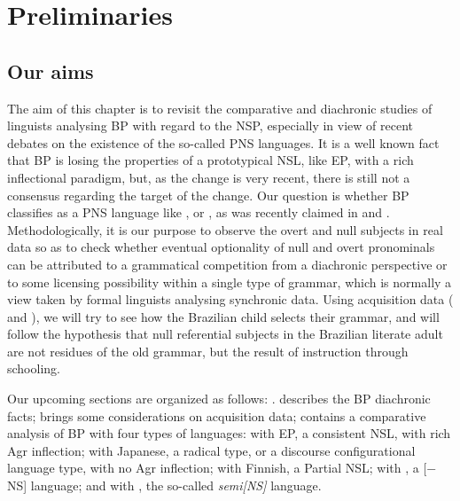 \documentclass[output=paper]{langsci/langscibook}
\begin{document}
\section{Preliminaries}\label{sec:26.2}

\subsection{Our aims}\label{sec:26.2.1}

The aim of this chapter is to revisit the comparative and diachronic studies of
linguists analysing \gls{BP} with regard to the \gls{NSP}, especially in view
of recent debates on the existence of the so-called \gls{PNS} languages.  It is
a well known fact that \gls{BP} is losing the
properties of a prototypical \gls{NSL}, like \gls{EP}, with a rich
inflectional paradigm, but, as the change is very recent, there is still not a
consensus regarding the target of the change. Our question is whether
\gls{BP} classifies as a \gls{PNS} language like
,  or , as was recently claimed in
\citet{Holmberg2010} and \citet{HolShee2010}. Methodologically, it is our
purpose to observe the overt and null subjects in real data so as to check
whether eventual optionality of null and overt pronominals can be attributed to
a grammatical competition from a diachronic perspective \citep{Kroch1994} or to
some licensing possibility within a single type of grammar, which is normally a
view taken by formal linguists analysing synchronic data. Using
acquisition data (\citealt{Magalhaes2003} and
\citealt{Kato2011}), we will try to see how the Brazilian child selects their
grammar, and will follow the hypothesis that null referential subjects in the
Brazilian literate adult are not residues of the old grammar, but the result of
instruction through schooling.

Our  upcoming sections are organized as follows:  .
describes the \gls{BP} diachronic facts;
 brings some considerations on acquisition data;
 contains a comparative analysis of \gls{BP} with four types of languages:  with
\gls{EP}, a consistent \gls{NSL}, with rich Agr
inflection;  with Japanese, a radical type, or a discourse
configurational language type, with no Agr inflection; 
with Finnish, a Partial \gls{NSL};  with , a
[$-$NS] language; and  with , the so-called
\emph{semi[NS]} language.
\end{document}

